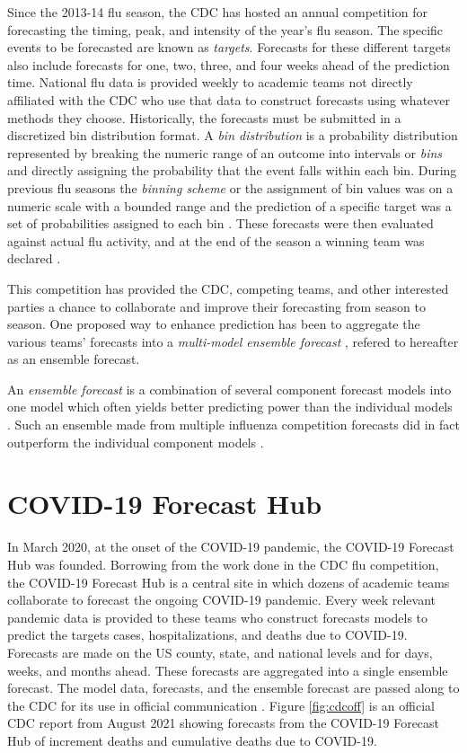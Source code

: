 \documentclass[11pt,notitlepage]{isuthesis}
\begin{document}
Since the 2013-14 flu season, the CDC has hosted an annual competition for 
forecasting the timing, peak, and intensity of the year's flu 
season. The specific events to be forecasted are known as \emph{targets}.
Forecasts
for these different targets also include forecasts for one, two, three, and 
four weeks ahead of the prediction time. National flu data is provided weekly 
to academic teams not directly affiliated with the CDC who use that data to 
construct forecasts using 
whatever methods they choose. Historically, the forecasts must be 
submitted 
in a discretized bin distribution
format. A \emph{bin distribution} is a probability distribution represented by
breaking the numeric range of an outcome into intervals or \emph{bins} and
directly assigning the probability that the event falls within each bin.
During previous flu seasons the \emph{binning scheme} or the assignment of 
bin values was on a numeric 
scale with a bounded range and the 
prediction of a specific target was a set of probabilities assigned to each bin
\cite[]{mcgowan2019collaborative}.
These forecasts were then evaluated against actual flu activity, and at 
the end of the season a winning team was declared \cite[]{cdcflusight}.

This competition has provided the CDC, competing teams, and other interested
parties a chance to collaborate and improve their forecasting from season to
season. One 
proposed way to enhance prediction has been to aggregate the various teams'
forecasts into a \emph{multi-model ensemble forecast} 
\cite[]{mcgowan2019collaborative,mcandrew2019adaptively,reich2019accuracy},
refered to hereafter as an ensemble forecast.

An \emph{ensemble forecast} is a combination of several component forecast 
models into one model which often yields better predicting power than the 
individual models \cite[]{cramer2021evaluation}. Such an ensemble made from 
multiple influenza competition forecasts did in fact outperform the individual 
component models \cite[]{reich2019accuracy}.



\section{COVID-19 Forecast Hub}
In March 2020, at the onset of the COVID-19 pandemic, the COVID-19 Forecast Hub
was founded. Borrowing from the work done in the CDC flu competition, the 
COVID-19 Forecast Hub is a central site in 
which dozens of academic teams collaborate to forecast the ongoing COVID-19 
pandemic.
Every week relevant
pandemic data is provided to these teams who construct forecasts models to 
predict the targets cases, hospitalizations, and deaths due to COVID-19. 
Forecasts are 
made on the US county,
state, and national levels and for days, weeks, and months ahead.
These forecasts are aggregated into a single ensemble forecast. The model data,
forecasts, and the ensemble forecast are passed along to the CDC for its use in 
official
communication \cite[]{Cramer2021-hub-dataset}. Figure \ref{fig:cdcoff} is an 
official CDC report from August 2021 showing forecasts from the COVID-19 
Forecast Hub of increment deaths and cumulative deaths due to COVID-19.
\end{document}
